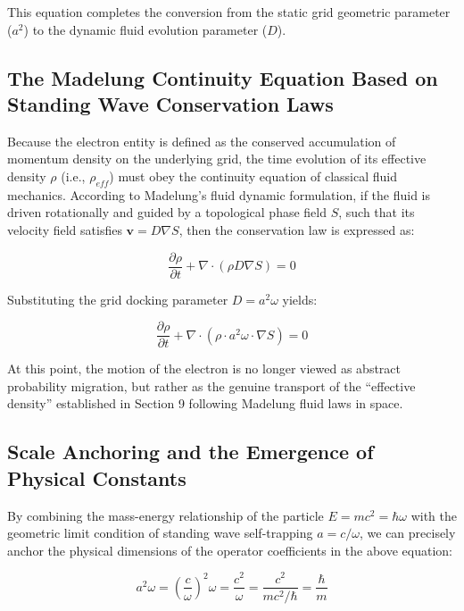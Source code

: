 \documentclass[12pt, a4paper]{article}
\begin{document}
This equation completes the conversion from the static grid geometric parameter ($a^2$) to the dynamic fluid evolution parameter ($D$).

\subsection{The Madelung Continuity Equation Based on Standing Wave Conservation Laws}

Because the electron entity is defined as the conserved accumulation of momentum density on the underlying grid, the time evolution of its effective density $\rho$ (i.e., $\rho_{eff}$) must obey the continuity equation of classical fluid mechanics. According to Madelung's fluid dynamic formulation, if the fluid is driven rotationally and guided by a topological phase field $S$, such that its velocity field satisfies $\mathbf{v} = D \nabla S$, then the conservation law is expressed as:

\begin{equation}
\frac{\partial \rho}{\partial t} + \nabla \cdot (\rho D \nabla S) = 0 
\end{equation}

Substituting the grid docking parameter $D = a^2 \omega$ yields:

\begin{equation}
\frac{\partial \rho}{\partial t} + \nabla \cdot (\rho \cdot a^2 \omega \cdot \nabla S) = 0 
\end{equation}

At this point, the motion of the electron is no longer viewed as abstract probability migration, but rather as the genuine transport of the ``effective density'' established in Section 9 following Madelung fluid laws in space.

\subsection{Scale Anchoring and the Emergence of Physical Constants}

By combining the mass-energy relationship of the particle $E = mc^2 = \hbar\omega$ with the geometric limit condition of standing wave self-trapping $a = c/\omega$, we can precisely anchor the physical dimensions of the operator coefficients in the above equation:

\begin{equation}
a^2 \omega = \left( \frac{c}{\omega} \right)^2 \omega = \frac{c^2}{\omega} = \frac{c^2}{mc^2/\hbar} = \frac{\hbar}{m} 
\end{equation}
\end{document}
